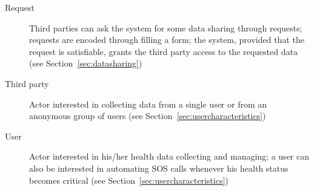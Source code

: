       \begin{description}

        \item[Request] Third parties can ask the system for some data sharing through requests; requests are encoded through filling a form; the system, provided that the request is satisfiable, grants the third party access to the requested data (see Section~\ref{sec:datasharing}) 
        \item[Third party] Actor interested in collecting data from a single user or from an anonymous group of users (see Section~\ref{sec:usercharacteristics}) %
        \item[User] Actor interested in his/her health data collecting and managing; a user can also be interested in automating SOS calls whenever his health status becomes critical (see Section~\ref{sec:usercharacteristics}) %


\end{description}
